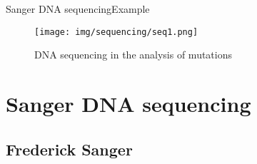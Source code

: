 \documentclass[10pt]{beamer}
\newcommand{\1}{
	\setbeamertemplate{background}{
		\texttt{[image: img/1]}
		\tikz[overlay] \fill[fill opacity=0.75,fill=white] (0,0) rectangle (-\paperwidth,\paperheight);
	}
}
\begin{document}
\begin{frame}{Sanger DNA sequencing}{Example}
	\begin{figure}[]
		\centering
		\texttt{[image: img/sequencing/seq1.png]}
		\label{img:mot2}
		\caption{DNA sequencing in the analysis of mutations}
	\end{figure}
\end{frame}

\section{Sanger DNA sequencing}





\subsection{Frederick Sanger}
\end{document}
